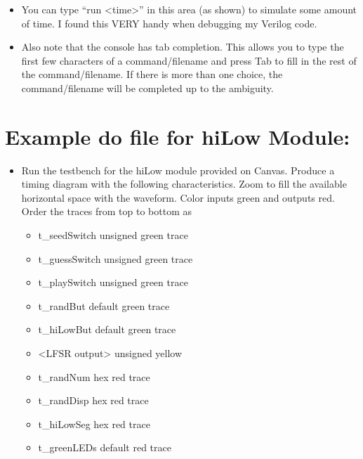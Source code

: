 \begin{itemize}
\item
  You can type ``run \textless time\textgreater'' in this area (as
  shown) to simulate some amount of time. I found this VERY handy when
  debugging my Verilog code.
\item
  Also note that the console has tab completion. This allows you to type
  the first few characters of a command/filename and press Tab to fill
  in the rest of the command/filename. If there is more than one choice,
  the command/filename will be completed up to the ambiguity.
\end{itemize}

\hypertarget{example-do-file-for-hilow-module}{%
\section{\texorpdfstring{Example do file for hiLow Module:
}{Example do file for hiLow Module: }}\label{example-do-file-for-hilow-module}}

\begin{itemize}
\item
  Run the testbench for the hiLow module provided on Canvas. Produce a
  timing diagram with the following characteristics. Zoom to fill the
  available horizontal space with the waveform. Color inputs green and
  outputs red. Order the traces from top to bottom as

  \begin{itemize}
  \item
    t\_seedSwitch unsigned green trace
  \item
    t\_guessSwitch unsigned green trace
  \item
    t\_playSwitch unsigned green trace
  \item
    t\_randBut default green trace
  \item
    t\_hiLowBut default green trace
  \item
    \textless LFSR output\textgreater{} unsigned yellow
  \item
    t\_randNum hex red trace
  \item
    t\_randDisp hex red trace
  \item
    t\_hiLowSeg hex red trace
  \item
    t\_greenLEDs default red trace
  \end{itemize}
\end{itemize}

